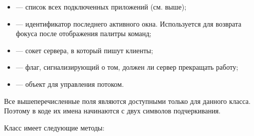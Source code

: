 \begin{itemize}
    \item {} — список всех подключенных приложений (см.
         выше);
    \item {} — идентификатор последнего активного окна.
        Используется для возврата фокуса после отображения палитры команд;
    \item {} — сокет сервера, в который пишут клиенты;
    \item {} — флаг, сигнализирующий о том, должен ли сервер
        прекращать работу;
    \item {} — объект для управления потоком.
\end{itemize}

Все вышеперечисленные поля являются доступными только для данного класса.
Поэтому в коде их имена начинаются с двух символов подчеркивания.

Класс  имеет следующие методы:

